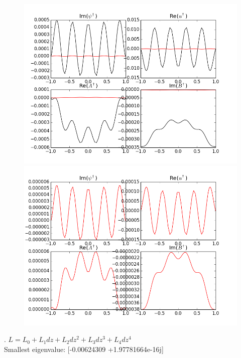 \documentclass[letterpaper,12pt]{article}
\begin{document}
\begin{figure}[h!]
\centering
\includegraphics[scale=0.5]{ah_pmmp}
\includegraphics[scale=0.5]{ah_pmmp_redonly}
\end{figure}

. $L = L_0 + L_1 dz + L_2 dz^2 + L_3 dz^3 + L_4 dz^4$ \\

Smallest eigenvalue: [-0.00624309 +1.97781664e-16j] \\
\end{document}
